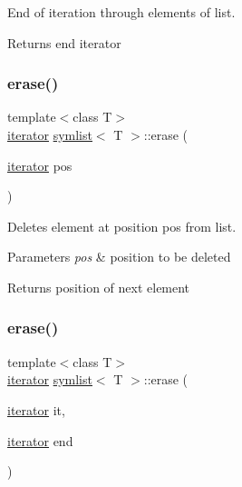 End of iteration through elements of list. 

\begin{DoxyReturn}{Returns}
end iterator 
\end{DoxyReturn}
\mbox{\label{classsymlist_a75fc1fc7db7b20cc430ddb8577608904}} 
\subsubsection{\texorpdfstring{erase()}{erase()}\hspace{0.1cm}{\footnotesize\ttfamily [1/2]}}
{\footnotesize\ttfamily template$<$class T$>$ \\
\mbox{\hyperlink{structsymlist__iterator}{iterator}} \mbox{\hyperlink{classsymlist}{symlist}}$<$ T $>$\+::erase (\begin{DoxyParamCaption}\item[{\mbox{\hyperlink{structsymlist__iterator}{iterator}}}]{pos }\end{DoxyParamCaption})}



Deletes element at position {\ttfamily pos} from list. 


\begin{DoxyParams}{Parameters}
{\em pos} & position to be deleted\\
\hline
\end{DoxyParams}
\begin{DoxyReturn}{Returns}
position of next element 
\end{DoxyReturn}
\mbox{\label{classsymlist_a53128defa9aedb016affcfa27bf201da}} 
\subsubsection{\texorpdfstring{erase()}{erase()}\hspace{0.1cm}{\footnotesize\ttfamily [2/2]}}
{\footnotesize\ttfamily template$<$class T$>$ \\
\mbox{\hyperlink{structsymlist__iterator}{iterator}} \mbox{\hyperlink{classsymlist}{symlist}}$<$ T $>$\+::erase (\begin{DoxyParamCaption}\item[{\mbox{\hyperlink{structsymlist__iterator}{iterator}}}]{it,  }\item[{\mbox{\hyperlink{structsymlist__iterator}{iterator}}}]{end }\end{DoxyParamCaption})}



